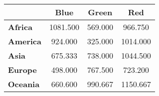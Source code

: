\begin{tabular}{lccc}
\toprule
                  & \textbf{Blue} & \textbf{Green} & \textbf{Red} \\
\toprule
\textbf{Africa}   & 1081.500 & 569.000 & 966.750 \\
\textbf{America}  & 924.000 & 325.000 & 1014.000 \\
\textbf{Asia}     & 675.333 & 738.000 & 1044.500 \\
\textbf{Europe}   & 498.000 & 767.500 & 723.200 \\
\textbf{Oceania}  & 660.600 & 990.667 & 1150.667 \\


\bottomrule
\end{tabular}
